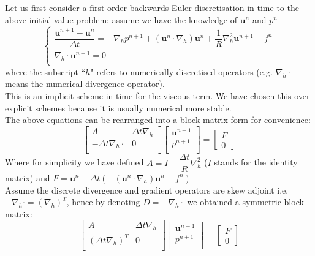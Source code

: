 Let us first consider a first order backwards Euler discretisation in time to the above initial value problem: assume we have the knowledge of $\textbf{u}^n$ and $p^n$ \label{backwards Euler discretisation}
\begin{equation}
\begin{cases}
\dfrac{\textbf{u}^{n+1} - \textbf{u}^n}{\Delta t} = - \nabla_h p^{n+1} + (\textbf{u}^n\cdot\nabla_h)\textbf{u}^n + \dfrac{1}{R}\nabla_h^2\textbf{u}^{n+1} + f^n\\
\nabla_h \cdot \textbf{u}^{n+1} = 0\\
\end{cases}
\end{equation}
where the subscript ``$h$" refers to numerically discretised operators (e.g. $\nabla_h \cdot$ means the numerical divergence operator).\\
This is an implicit scheme in time for the viscous term. We have chosen this over explicit schemes because it is usually numerical more stable.\\

The above equations can be rearranged into a block matrix form for convenience:
\begin{equation}
\begin{bmatrix}
A & \Delta t \nabla_h\\
-\Delta t \nabla_h \cdot & 0\\
\end{bmatrix}
\begin{bmatrix}
\textbf{u}^{n+1}\\
p^{n+1}\\
\end{bmatrix}
= \begin{bmatrix}
F\\
0
\end{bmatrix}
\end{equation}
Where for simplicity we have defined $A = I - \dfrac{\Delta t}{R}\nabla_h^2$ ($I$ stands for the identity matrix) and
$F = \textbf{u}^n  - \Delta t \left(-(\textbf{u}^n\cdot\nabla_h)\textbf{u}^n + f^n\right)$\\

Assume the discrete divergence and gradient operators are skew adjoint i.e. $-\nabla_h \cdot = (\nabla_h)^T$, hence by denoting $D = -\nabla_h \cdot$ we obtained a symmetric block matrix:
\begin{equation}
\begin{bmatrix}
A & \Delta t \nabla_h\\
(\Delta t \nabla_h)^T & 0\\
\end{bmatrix}
\begin{bmatrix}
\textbf{u}^{n+1}\\
p^{n+1}\\
\end{bmatrix}
= \begin{bmatrix}
F\\
0
\end{bmatrix}
\end{equation}

